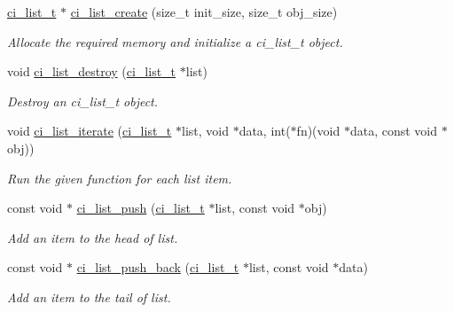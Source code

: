 \begin{DoxyCompactItemize}
\item 
\hyperlink{group__LISTS_ga785498c08d3d0440e1403146d0dfdb57}{ci\_\-list\_\-t} $\ast$ \hyperlink{group__LISTS_gaad0298a6a8b8b941153be59c99953581}{ci\_\-list\_\-create} (size\_\-t init\_\-size, size\_\-t obj\_\-size)
\begin{DoxyCompactList}\small\item\em Allocate the required memory and initialize a ci\_\-list\_\-t object. \item\end{DoxyCompactList}\item 
void \hyperlink{group__LISTS_gaa6f56c0149c919fa0c324c8dbff28d86}{ci\_\-list\_\-destroy} (\hyperlink{group__LISTS_ga785498c08d3d0440e1403146d0dfdb57}{ci\_\-list\_\-t} $\ast$list)
\begin{DoxyCompactList}\small\item\em Destroy an ci\_\-list\_\-t object. \item\end{DoxyCompactList}\item 
void \hyperlink{group__LISTS_ga41e1711d5e7f24c8f1df51173293f668}{ci\_\-list\_\-iterate} (\hyperlink{group__LISTS_ga785498c08d3d0440e1403146d0dfdb57}{ci\_\-list\_\-t} $\ast$list, void $\ast$data, int($\ast$fn)(void $\ast$data, const void $\ast$obj))
\begin{DoxyCompactList}\small\item\em Run the given function for each list item. \item\end{DoxyCompactList}\item 
const void $\ast$ \hyperlink{group__LISTS_ga3831f98e89e66269a1285a3db4e7f828}{ci\_\-list\_\-push} (\hyperlink{group__LISTS_ga785498c08d3d0440e1403146d0dfdb57}{ci\_\-list\_\-t} $\ast$list, const void $\ast$obj)
\begin{DoxyCompactList}\small\item\em Add an item to the head of list. \item\end{DoxyCompactList}\item 
const void $\ast$ \hyperlink{group__LISTS_gaa0dae6fec0c83e67b1630bb7c6cea78c}{ci\_\-list\_\-push\_\-back} (\hyperlink{group__LISTS_ga785498c08d3d0440e1403146d0dfdb57}{ci\_\-list\_\-t} $\ast$list, const void $\ast$data)
\begin{DoxyCompactList}\small\item\em Add an item to the tail of list. \item\end{DoxyCompactList}\item 

\end{DoxyCompactItemize}
